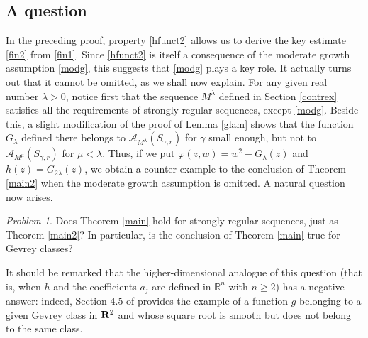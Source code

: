 \documentclass[a4paper]{amsart}
\theoremstyle{plain}
\theoremstyle{remark}
\newtheorem*{prob}{Problem}
\begin{document}
\subsection{A question} 
In the preceding proof, property \eqref{hfunct2} allows us to derive the key estimate \eqref{fin2} from \eqref{fin1}. Since \eqref{hfunct2} is itself a consequence of the moderate growth assumption \eqref{modg}, this suggests that \eqref{modg} plays a key role. It actually turns out that it cannot be omitted, as we shall now explain. For any given real number $\lambda>0 $, notice first that the sequence $ M^\lambda $ defined in Section \ref{contrex} satisfies all the requirements of strongly regular sequences, except \eqref{modg}. Beside this, a slight modification of the proof of Lemma \ref{glam} shows that the function $ G_\lambda $ defined there belongs to $ \mathcal{A}_{M^\lambda}(S_{\gamma,r}) $ for $ \gamma $ small enough, but not to $ \mathcal{A}_{M^\mu}(S_{\gamma,r}) $ for $ \mu<\lambda $. Thus, if we put $ \varphi(z,w)=w^2-G_\lambda(z) $ and $ h(z)= G_{2\lambda}(z) $, we obtain a counter-example to the conclusion of Theorem \ref{main2} when the moderate growth assumption is omitted. A natural question now arises. 

\begin{prob}
Does Theorem \ref{main} hold for strongly regular sequences, just as Theorem \ref{main2}? In particular, is the conclusion of Theorem \ref{main} true for Gevrey classes?
\end{prob} 

It should be remarked that the higher-dimensional analogue of this question (that is, when $ h $ and the coefficients $ a_j $ are defined in $ \mathbb{R}^n $ with $ n\geq 2 $) has a negative answer: indeed, Section 4.5 of \cite{Thi0} provides the example of a function $ g $ belonging to a given Gevrey class in $ {\bf R}^2 $ and whose square root is smooth but does not belong to the same class.
\end{document}
